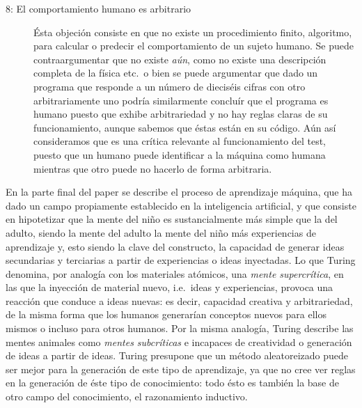 \documentclass[12pt]{memoir}
\begin{document}
\begin{description}
	\item[8: El comportamiento humano es arbitrario] Ésta objeción consiste en que no existe un procedimiento finito, algoritmo, para calcular o predecir el comportamiento de un sujeto humano. Se puede contraargumentar que no existe \textit{aún}, como no existe una descripción completa de la física etc.\ o bien se puede argumentar que dado un programa que responde a un número de dieciséis cifras con otro arbitrariamente uno podría similarmente concluír que el programa es humano puesto que exhibe arbitrariedad y no hay reglas claras de su funcionamiento, aunque sabemos que éstas están en su código. Aún así consideramos que es una crítica relevante al funcionamiento del test, puesto que un humano puede identificar a la máquina como humana mientras que otro puede no hacerlo de forma arbitraria.
\end{description}

En la parte final del paper se describe el proceso de aprendizaje máquina, que ha dado un campo propiamente establecido en la inteligencia artificial, y que consiste en hipotetizar que la mente del niño es sustancialmente más simple que la del adulto, siendo la mente del adulto la mente del niño más experiencias de aprendizaje y, esto siendo la clave del constructo, la capacidad de generar ideas secundarias y terciarias a partir de experiencias o ideas inyectadas. Lo que Turing denomina, por analogía con los materiales atómicos, una \textit{mente supercrítica}, en las que la inyección de material nuevo, i.e.\ ideas y experiencias, provoca una reacción que conduce a ideas nuevas: es decir, capacidad creativa y arbitrariedad, de la misma forma que los humanos generarían conceptos nuevos para ellos mismos o incluso para otros humanos. Por la misma analogía, Turing describe las mentes animales como \textit{mentes subcríticas} e incapaces de creatividad o generación de ideas a partir de ideas. Turing presupone que un método aleatoreizado puede ser mejor para la generación de este tipo de aprendizaje, ya que no cree ver reglas en la generación de éste tipo de conocimiento: todo ésto es también la base de otro campo del conocimiento, el razonamiento inductivo.
\end{document}
